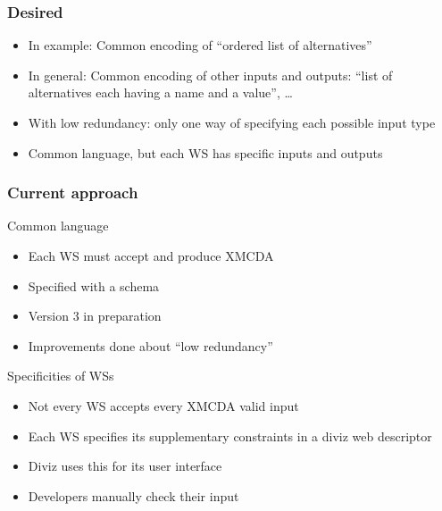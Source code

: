 \documentclass[french,english]{beamer}
\begin{document}
\begin{frame}
	\frametitle{Desired}
	\begin{itemize}
		\item In example: Common encoding of “ordered list of alternatives”
		\item In general: Common encoding of other inputs and outputs: “list of alternatives each having a name and a value”, …
		\item With low redundancy: only one way of specifying each possible input type
		\item Common language, but each WS has specific inputs and outputs
	\end{itemize}
\end{frame}

\begin{frame}
	\frametitle{Current approach}
	Common language
	\begin{itemize}
		\item Each \ac{WS} must accept and produce XMCDA
		\item Specified with a schema
		\item Version 3 in preparation
		\item Improvements done about “low redundancy”
	\end{itemize}
	Specificities of \acp{WS}
	\begin{itemize}
		\item Not every \ac{WS} accepts every XMCDA valid input
		\item Each \ac{WS} specifies its supplementary constraints in a diviz web descriptor
		\item Diviz uses this for its user interface
		\item Developers manually check their input
	\end{itemize}
\end{frame}
\end{document}
